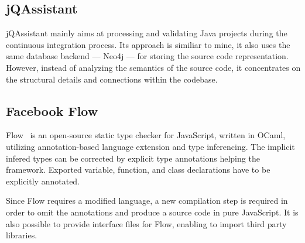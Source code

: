 \subsection{jQAssistant}

jQAssistant mainly aims at processing and validating Java projects during the continuous integration process. Its approach is similiar to mine, it also uses the same database backend --- Neo4j --- for storing the source code representation. However, instead of analyzing the semantics of the source code, it concentrates on the structural details and connections within the codebase.


\subsection{Facebook Flow}
Flow~\cite{flow} is an open-source static type checker for JavaScript, written in OCaml, utilizing annotation-based language extension and type inferencing. The implicit infered types can be corrected by explicit type annotations helping the framework. Exported variable, function, and class declarations have to be explicitly annotated.

Since Flow requires a modified language, a new compilation step is required in order to omit the annotations and produce a source code in pure JavaScript.
It is also possible to provide interface files for Flow, enabling to import third party libraries.

